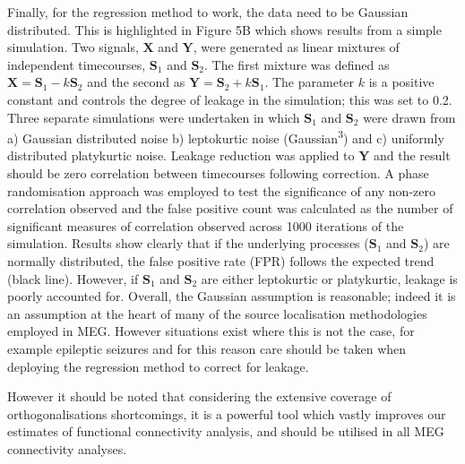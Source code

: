 Finally, for the regression method to work, the data need to be Gaussian distributed. This is highlighted in Figure 5B which shows results from a simple simulation. Two signals, $\mathbf{X}$ and $\mathbf{Y}$, were generated as linear mixtures of independent timecourses, $\mathbf{S}_1$ and $\mathbf{S}_2$. The first mixture was defined as $\mathbf{X}=\mathbf{S}_1-k\mathbf{S}_2$ and the second as $\mathbf{Y}=\mathbf{S}_2+k\mathbf{S}_1$. The parameter $k$ is a positive constant and controls the degree of leakage in the simulation; this was set to 0.2. Three separate simulations were undertaken in which $\mathbf{S}_1$ and $\mathbf{S}_2$ were drawn from a) Gaussian distributed noise b) leptokurtic noise (Gaussian\textsuperscript{3}) and c) uniformly distributed platykurtic noise. Leakage reduction was applied to \textbf{Y} and the result should be zero correlation between timecourses following correction. A phase randomisation approach \citep{Prichard1994} was employed to test the significance of any non-zero correlation observed and the false positive count was calculated as the number of significant measures of correlation observed across 1000 iterations of the simulation. Results show clearly that if the underlying processes ($\mathbf{S}_1$ and $\mathbf{S}_2$) are normally distributed, the false positive rate (FPR) follows the expected trend (black line). However, if $\mathbf{S}_1$ and $\mathbf{S}_2$ are either leptokurtic or platykurtic, leakage is poorly accounted for. Overall, the Gaussian assumption is reasonable; indeed it is an assumption at the heart of many of the source localisation methodologies employed in MEG. However situations exist where this is not the case, for example epileptic seizures \citep{Prendergast2013} and for this reason care should be taken when deploying the regression method to correct for leakage.

However it should be noted that considering the extensive coverage of orthogonalisations shortcomings, it is a powerful tool which vastly improves our estimates of functional connectivity analysis, and should be utilised in all MEG connectivity analyses.  

